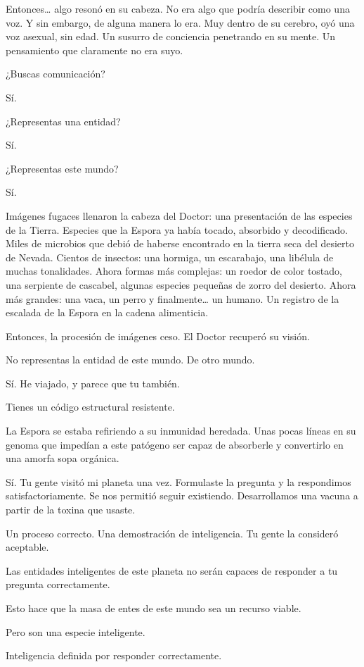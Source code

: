 Entonces\ldots{} algo resonó en su cabeza. No era algo que podría
describir como una voz. Y sin embargo, de alguna manera lo era. Muy
dentro de su cerebro, oyó una voz asexual, sin edad. Un susurro de
conciencia penetrando en su mente. Un pensamiento que claramente no era
suyo.

¿Buscas comunicación?

Sí.

¿Representas una entidad?

Sí.

¿Representas este mundo?

Sí.

Imágenes fugaces llenaron la cabeza del Doctor: una presentación de las
especies de la Tierra. Especies que la Espora ya había tocado, absorbido
y decodificado. Miles de microbios que debió de haberse encontrado en la
tierra seca del desierto de Nevada. Cientos de insectos: una hormiga, un
escarabajo, una libélula de muchas tonalidades. Ahora formas más
complejas: un roedor de color tostado, una serpiente de cascabel,
algunas especies pequeñas de zorro del desierto. Ahora más grandes: una
vaca, un perro y finalmente\ldots{} un humano. Un registro de la
escalada de la Espora en la cadena alimenticia.

Entonces, la procesión de imágenes ceso. El Doctor recuperó su visión.

No representas la entidad de este mundo. De otro mundo.

Sí. He viajado, y parece que tu también.

Tienes un código estructural resistente.

La Espora se estaba refiriendo a su inmunidad heredada. Unas pocas
líneas en su genoma que impedían a este patógeno ser capaz de absorberle
y convertirlo en una amorfa sopa orgánica.

Sí. Tu gente visitó mi planeta una vez. Formulaste la pregunta y la
respondimos satisfactoriamente. Se nos permitió seguir existiendo.
Desarrollamos una vacuna a partir de la toxina que usaste.

Un proceso correcto. Una demostración de inteligencia. Tu gente la
consideró aceptable.

Las entidades inteligentes de este planeta no serán capaces de responder
a tu pregunta correctamente.

Esto hace que la masa de entes de este mundo sea un recurso viable.

Pero son una especie inteligente.

Inteligencia definida por responder correctamente.

